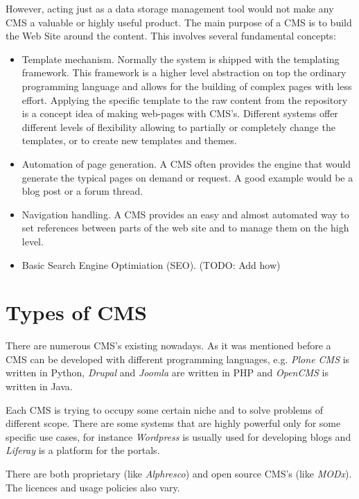 However, acting just as a data storage management tool would not make any CMS a
valuable or highly useful product. The main purpose of a CMS is to build the Web
Site around the content. This involves several fundamental concepts:
\begin{itemize}
	\item Template mechanism. Normally the system is shipped with the  templating
	framework. This framework is a higher level abstraction on top the ordinary
	programming language and allows for the building of complex pages with less
	effort.
	Applying the specific template to the raw content from the repository is a
	concept idea of making web-pages with CMS's.
	Different systems offer different levels of flexibility allowing to partially or
	completely change the templates, or to create new templates and themes.

	\item Automation of page generation. A CMS often provides the engine that would
	generate the typical pages on demand or request. A good example would be a blog
	post or a forum thread.
	
    \item Navigation handling. A CMS provides an easy and almost automated way to
    set references between parts of the web site and to manage them on the high
    level.
	
	\item Basic Search Engine Optimiation (SEO). (TODO: Add how)
\end{itemize}


\section{Types of CMS} 
There are numerous CMS's existing nowadays. As it was mentioned
before a CMS can be developed with different programming languages, e.g.
\emph{Plone CMS} is written in Python, \emph{Drupal} and \emph{Joomla} are
written in PHP and \emph{OpenCMS} is written in Java.

Each CMS is trying to occupy some certain niche and to solve problems of
different scope. There are some systems that are highly powerful only for some
specific use cases, for instance \emph{Wordpress} is usually used for developing
blogs and \emph{Liferay} is a platform for the portals.

There are both proprietary (like \emph{Alphresco}) and open source CMS's (like \emph{MODx}).
The licences and usage policies also vary.

